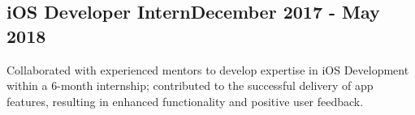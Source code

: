 \subsection{{iOS Developer Intern\hfill December 2017 - May 2018}}
\begin{zitemize}
\item Collaborated with experienced mentors to develop expertise in iOS Development within a 6-month internship; contributed to the successful delivery of app features, resulting in enhanced functionality and positive user feedback.
    
\end{zitemize}